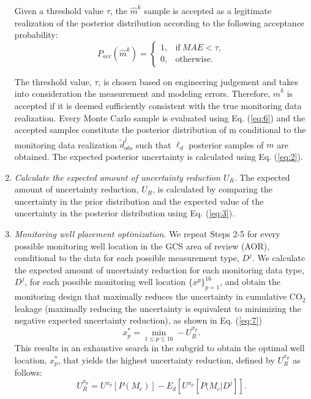 \documentclass[a4paper,fleqn]{cas-sc}
\begin{document}
\begin{enumerate}[Step 1.]
Given a threshold value $\tau$, the $\hat{m}^k$ sample is accepted as a legitimate realization of the posterior distribution according to the following acceptance probability:
\begin{equation} \label{eq:6}
    P_{acc}(\hat{m}^k) = 
    \begin{cases}
      1, & \text{if}\ MAE<\tau ,\\
      0, & \text{otherwise}.
    \end{cases}
\end{equation}

The threshold value, $\tau$, is chosen based on engineering judgement and takes into consideration the measurement and modeling errors. Therefore, $\hat{m}^k$ is accepted if it is deemed sufficiently consistent with the true monitoring data realization. Every Monte Carlo sample is evaluated using Eq. (\ref{eq:6}) and the accepted samples constitute the posterior distribution of m conditional to the monitoring data realization $\widetilde{d}^j_{obs}$ such that $\ell_d$ posterior samples of $m$ are obtained. The expected posterior uncertainty is calculated using Eq. (\ref{eq:2}). 

\item \textit{Calculate the expected amount of uncertainty reduction $U_R$}. The expected amount of uncertainty reduction, $U_R$, is calculated by comparing the uncertainty in the prior distribution and the expected value of the uncertainty in the posterior distribution using Eq. (\ref{eq:3}). 

\item \textit{Monitoring well placement optimization}. We repeat Steps 2-5 for every possible monitoring well location in the GCS area of review (AOR), conditional to the data for each possible measurement type, $D^j$. We calculate the expected amount of uncertainty reduction for each monitoring data type, $D^j$, for each possible monitoring well location $\{{x^p}\}_{p=1}^{16}$, and obtain the monitoring design that maximally reduces the uncertainty in cumulative CO$_2$ leakage (maximally reducing the uncertainty is equivalent to minimizing the negative expected uncertainty reduction), as shown in Eq. (\ref{eq:7})
\begin{equation} \label{eq:7}
    x_p^* = \min\limits_{1\leq p \leq 16} -U_R^{x_p} .
\end{equation}
This results in an exhaustive search in the subgrid to obtain the optimal well location, $x_p^*$, that yields the highest uncertainty reduction, defined by $U_R^{x_p}$ as follows:
\begin{equation} \label{eq:8}
    U_R^{x_p} = U^{x_p}[P(M_c)] - E_d[U^{x_p}[P(M_c \vert D^j]] .
\end{equation}
\end{enumerate}
\end{document}
